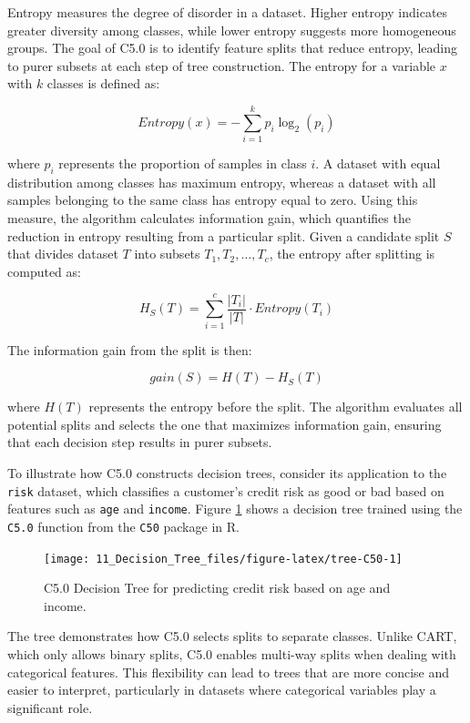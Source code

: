 \documentclass[
  11pt,
]{book}
\theoremstyle{definition}
\theoremstyle{definition}
\theoremstyle{definition}
\theoremstyle{definition}
\theoremstyle{remark}
\begin{document}
Entropy measures the degree of disorder in a dataset. Higher entropy indicates greater diversity among classes, while lower entropy suggests more homogeneous groups. The goal of C5.0 is to identify feature splits that reduce entropy, leading to purer subsets at each step of tree construction. The entropy for a variable \(x\) with \(k\) classes is defined as:

\[
Entropy(x) = - \sum_{i=1}^k p_i \log_2(p_i)
\]

where \(p_i\) represents the proportion of samples in class \(i\). A dataset with equal distribution among classes has maximum entropy, whereas a dataset with all samples belonging to the same class has entropy equal to zero. Using this measure, the algorithm calculates information gain, which quantifies the reduction in entropy resulting from a particular split. Given a candidate split \(S\) that divides dataset \(T\) into subsets \(T_1, T_2, \dots, T_c\), the entropy after splitting is computed as:

\[
H_S(T) = \sum_{i=1}^c \frac{|T_i|}{|T|} \cdot Entropy(T_i)
\]

The information gain from the split is then:

\[
gain(S) = H(T) - H_S(T)
\]

where \(H(T)\) represents the entropy before the split. The algorithm evaluates all potential splits and selects the one that maximizes information gain, ensuring that each decision step results in purer subsets.

To illustrate how C5.0 constructs decision trees, consider its application to the \texttt{risk} dataset, which classifies a customer's credit risk as good or bad based on features such as \texttt{age} and \texttt{income}. Figure \ref{fig:tree-C50} shows a decision tree trained using the \texttt{C5.0} function from the \texttt{C50} package in R.

\begin{figure}[H]

{\centering \texttt{[image: 11\_Decision\_Tree\_files/figure-latex/tree-C50-1]} 

}

\caption{C5.0 Decision Tree for predicting credit risk based on age and income.}\label{fig:tree-C50}
\end{figure}

The tree demonstrates how C5.0 selects splits to separate classes. Unlike CART, which only allows binary splits, C5.0 enables multi-way splits when dealing with categorical features. This flexibility can lead to trees that are more concise and easier to interpret, particularly in datasets where categorical variables play a significant role.
\end{document}

